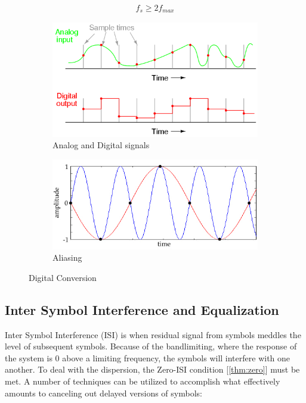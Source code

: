 \documentclass[]{article}
\begin{document}
\begin{align}
\label{eq:nyquist}
f_s \geq 2 f_{max}
\end{align}

\begin{figure}[h]
        \centering
        \begin{subfigure}[b]{0.4\textwidth}
                \includegraphics[width=\textwidth]{digitization.png}
                \caption{Analog and Digital signals}
                \label{fig:digitization}
        \end{subfigure}%
        \qquad \quad %
        \begin{subfigure}[b]{0.5\textwidth}
                \includegraphics[width=\textwidth]{aliasing.jpg}
                \caption{Aliasing \label{fig:alias}}
                \label{fig:alias}
        \end{subfigure}
        \caption{Digital Conversion \label{fig:digitize}}
\end{figure}

\newpage
\subsection{Inter Symbol Interference and Equalization}
\label{sec:ISIbackground}
Inter Symbol Interference (ISI) is when residual signal from symbols meddles the level of subsequent symbols.  Because of the bandlimiting, where the response of the system is 0 above a limiting frequency, the symbols will interfere with one another. To deal with the dispersion, the Zero-ISI condition [\ref{thm:zero}] must be met.  A number of techniques can be utilized to accomplish what effectively amounts to canceling out delayed versions of symbols:
\end{document}
